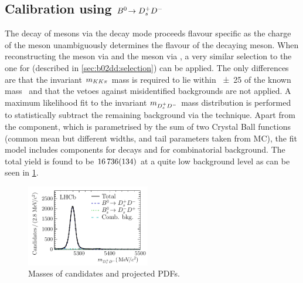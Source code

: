 
\subsection[Calibration using \texorpdfstring{$\BdToDsD$}{Bd2DsD} (2 pages)]{Calibration using \texorpdfstring{$\BdToDsD$}{Bd2DsD}}
\label{sec:dataanalysis:taggingcalibration:dsdcalibration}

The decay of \Bd mesons via the decay mode \BdToDsD proceeds flavour specific
as the charge of the \Dsp meson unambiguously determines the flavour of the
decaying \Bd meson. When reconstructing the \Dsp meson via \DspToKKpi and the
\Dp meson via \DpToKpipi, a very similar selection to the one for \BdToDD
(described in \cref{sec:b02dd:selection}) can be applied. The only differences
are that the invariant $m_{KK\pi}$ mass is required to lie within
\SI{\pm25}{\MeVcc} of the known \Dsp mass~\cite{PDG2014} and that the vetoes
against misidentified backgrounds are not applied. A maximum likelihood fit to
the invariant $m_{{{D}^+_{s}}{{D}^-}}$ mass distribution is performed to statistically
subtract the remaining background via the \sPlot technique. Apart from the
\BdToDsD component, which is parametrised by the sum of two Crystal Ball
functions (common mean but different widths, and tail parameters taken from
MC), the fit model includes components for \BsToDsD decays and for
combinatorial background. The total \BdToDsD yield is found to be
$\num{16736\pm134}$ at a quite low background level as can be seen in
\cref{fig:dataanalysis:taggingcalibration:dsdcalibration:mass}.

\begin{figure}[htb]
\centering
\includegraphics[width=0.48\textwidth]{05-DataAnalysis/tikz/pdf/DsD_MassFit.pdf}
\caption{Masses of \BdToDsD candidates and projected PDFs.}
\label{fig:dataanalysis:taggingcalibration:dsdcalibration:mass}
\end{figure}

